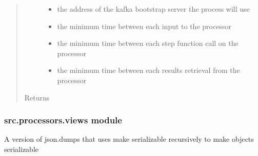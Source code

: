 \documentclass[letterpaper,10pt,english]{sphinxmanual}
\begin{document}
\begin{fulllineitems}
\begin{quote}
\begin{description}
\begin{itemize}
\item {} 
 \textendash{} the address of the kafka bootstrap server the process will use

\item {} 
 \textendash{} the minimum time between each input to the processor

\item {} 
 \textendash{} the minimum time between each step function call on the processor

\item {} 
 \textendash{} the minimum time between each results retrieval from the processor

\end{itemize}

\item[{Returns}] \leavevmode


\end{description}\end{quote}

\end{fulllineitems}



\subsubsection{src.processors.views module}
\label{\detokenize{src.processors:module-src.processors.views}}\label{\detokenize{src.processors:src-processors-views-module}}

\begin{fulllineitems}
\label{\detokenize{src.processors:src.processors.views.dumps}}
A version of json.dumps that uses make serializable recursively to make objects serializable

\end{fulllineitems}
\end{document}
